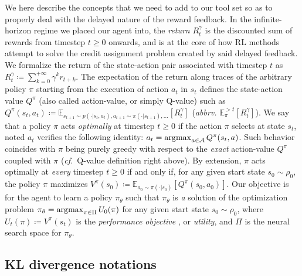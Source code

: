 We here describe the concepts that we need to add to our tool set so as to properly deal with the
delayed nature of the reward feedback.
In the infinite-horizon regime we placed our agent into, the \emph{return}
$R_t^\gamma$ is
the discounted sum of rewards from timestep $t \geq 0$ onwards, and is at the core of how RL methods
attempt to solve the credit assignment problem created by said delayed feedback. We formalize the return
of the state-action pair associated with timestep $t$ as
$R_t^\gamma \coloneqq \sum_{k=0}^{+\infty} \gamma^k r_{t+k}$.
The expectation of the return along traces of the arbitrary policy $\pi$ starting from the execution of
action $a_t$ in $s_t$ defines the state-action value $Q^\pi$ (also called action-value, or simply Q-value)
such as
$Q^\pi(s_t, a_t) \coloneqq
\mathbb{E}_{
s_{t+1} \sim p(\cdot | s_t, a_t),
a_{t+1} \sim \pi(\cdot | s_{t+1}), \ldots}
[R_t^\gamma]$
(\textit{abbrv.} $\mathbb{E}_\pi^{>t}[R_t^\gamma]$).
We say that a policy $\pi$ acts \textit{optimally}
at timestep $t \geq 0$ if the action $\pi$ selects at
state $s_t$, noted $a_t$ verifies the following identity:
$a_t = \operatorname*{\arg\!\max}_{a \in \mathcal{A}} Q^\pi (s_t, a)$.
Such behavior coincides with $\pi$ being purely greedy with respect to the \textit{exact}
action-value $Q^\pi$  coupled with $\pi$ (\textit{cf.}~Q-value definition right above).
By extension, $\pi$ acts optimally at \emph{every} timestep $t \geq 0$ if and only if,
for any given start state $s_0 \sim \rho_0$, the policy $\pi$ maximizes
$V^\pi (s_0) \coloneqq \mathbb{E}_{a_0 \sim \pi(\cdot | s_0)}[Q^\pi(s_0, a_0)]$.
Our objective is for the agent to learn a policy $\pi_\theta$ such that $\pi_\theta$
is \emph{a} solution of the optimization problem
$\pi_\theta = \operatorname*{\arg\!\max}_{\pi \in \Pi} U_0(\pi)$
for any given start state $s_0 \sim \rho_0$,
where $U_t(\pi) \coloneqq V^\pi(s_t)$ is the \emph{performance objective} \cite{Silver2014-dk},
or \emph{utility},
and $\Pi$ is the neural search space for $\pi_\theta$.

\subsection*{KL divergence notations}

